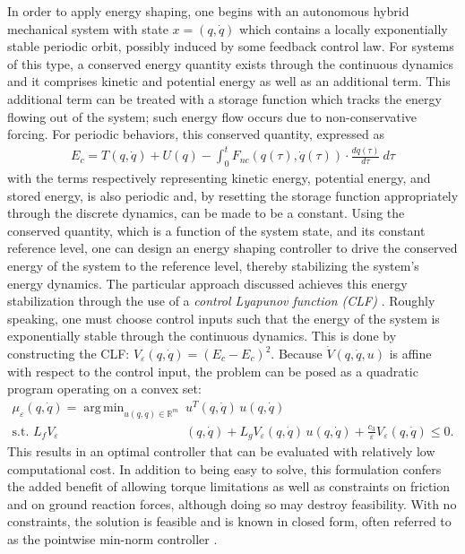 \documentclass[english]{article}
\DeclareMathOperator*{\argmin}{arg\,min}
\begin{document}
%
%
In order to apply energy shaping, one begins with an autonomous hybrid
mechanical system with state $x = (q, {\dot q})$ which contains a locally
exponentially stable periodic orbit, possibly induced by some feedback control
law.
%
For systems of this type, a conserved energy quantity exists through the
continuous dynamics and it comprises kinetic and potential energy as well as an
additional term.
%
This additional term can be treated with a storage function which tracks the
energy flowing out of the system; such energy flow occurs due to
non-conservative forcing.
%
For periodic behaviors, this conserved quantity, expressed as
\begin{align*}
  E_{c} = T(q, {\dot q}) + U(q) - \int_{0}^{t} \! F_{\mathit{nc}}(q(\tau), {\dot
    q}(\tau)) \cdot \frac{dq(\tau)}{d\tau} \ d\tau
\end{align*}
with the terms respectively representing kinetic energy, potential energy, and
stored energy, is also periodic and, by resetting the storage function
appropriately through the discrete dynamics, can be made to be a constant.
%
Using the conserved quantity, which is a function of the system state, and its
constant reference level, one can design an energy shaping controller to drive
the conserved energy of the system to the reference level, thereby stabilizing
the system's energy dynamics.
%
The particular approach discussed achieves this energy stabilization through the
use of a {\em control Lyapunov function (CLF)} \cite{Freeman1996}.
%
Roughly speaking, one must choose control inputs such that the energy of the
system is exponentially stable through the continuous dynamics.
%
This is done by constructing the CLF: $V_{\varepsilon}(q, {\dot q}) = (E_{c} -
E_{c})^{2}$.
%
Because ${\dot V}(q, {\dot q}, u)$ is affine with respect to the control input, the problem can be
posed as a quadratic program operating on a convex set:
\begin{align*}
  \mu_{\varepsilon}(q, {\dot q}) = \argmin_{u(q, {\dot q}) \in \mathbb{R}^{m}} \
  & u^T(q, {\dot q}) \, u(q, {\dot q})\\
  \mbox{s.t. } L_{f} V_{\varepsilon} &(q, {\dot q}) + L_{g} V_{\varepsilon}(q,
  {\dot q}) \, u(q, {\dot q}) +
  \frac{c_{3}}{\varepsilon} V_{\varepsilon}(q, {\dot q}) \leq 0.
\end{align*}
This results in an optimal controller that can be evaluated with relatively low
computational cost.
%
In addition to being easy to solve, this formulation confers the added benefit
of allowing torque limitations as well as constraints on friction and on ground
reaction forces, although doing so may destroy feasibility.
%
With no constraints, the solution is feasible and is known in closed form, often
referred to as the pointwise min-norm controller \cite{Freeman1996}.
\end{document}
